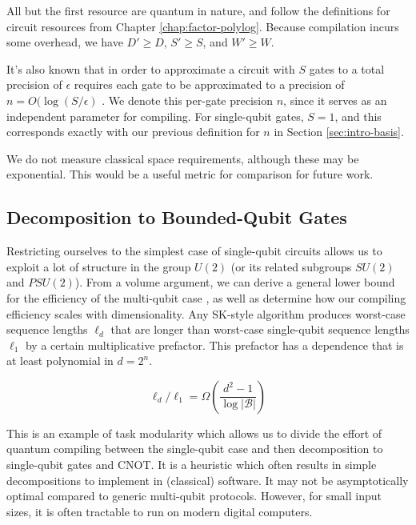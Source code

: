 All but the first resource are quantum in nature, and follow the definitions
for circuit resources from Chapter \ref{chap:factor-polylog}. Because
compilation incurs some overhead, we have $D' \ge D$, $S' \ge S$, and
$W' \ge W$.

It's also known that
in order to approximate a circuit with $S$ gates to a total precision of
$\epsilon$
requires each gate to be approximated to a precision of
$n = O(\log(S/\epsilon)$ \cite{Lloyd1995}. We denote this per-gate precision
$n$, since it serves as an independent parameter for compiling. For
single-qubit gates, $S = 1$, and this corresponds exactly with our previous
definition for $n$ in Section \ref{sec:intro-basis}.

We do not measure classical space requirements, although these may be
exponential. This would be a useful metric for comparison for future work.

\subsection{Decomposition to Bounded-Qubit Gates}
\label{subsec:qcompile-multi}

Restricting ourselves to the simplest case of
single-qubit circuits allows us to exploit a lot of structure
in the group $U(2)$ (or its related subgroups $SU(2)$ and $PSU(2)$).
From a volume argument, we can derive a general
lower bound for the efficiency of the multi-qubit case \cite{Harrow2002},
as well as determine how our compiling efficiency scales with dimensionality.
Any
SK-style algorithm produces worst-case sequence lengths $\ell_d$ that
are longer than worst-case single-qubit sequence lengths $\ell_1$ by a certain multiplicative
prefactor. This prefactor has a dependence that is at least
polynomial in $d = 2^n$. 

\begin{equation}
\ell_d / \ell_1 = \Omega \left( \frac{d^2 - 1}{ \log |\mathcal{B}| } \right )
\end{equation}

This is an example of task modularity which allows us
to divide the effort of quantum compiling between the
single-qubit case and then decomposition to single-qubit gates and
CNOT. It is a heuristic which often results
in simple decompositions to implement in (classical) software.
It may not be asymptotically optimal compared to generic 
multi-qubit protocols. However, for small input sizes, it is often
tractable to run on modern digital computers.

